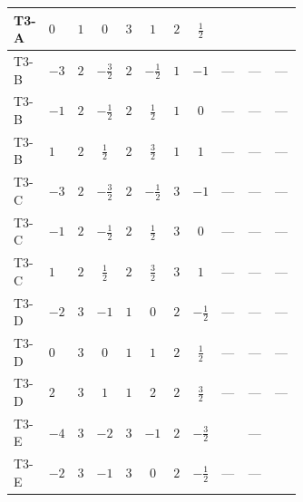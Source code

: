\documentclass[8pt]{article}
\begin{document}
\begin{landscape}
\begin{longtable}{@{}llcccccc >{\raggedright\arraybackslash}p{0.21\linewidth} >{\raggedright\arraybackslash}p{0.21\linewidth} >{\raggedright\arraybackslash}p{0.21\linewidth}@{}}
\midrule
T3-A & $0$ & $1$ & $0$ & $3$ & $1$ & $2$ & $\frac{1}{2}$ & \scriptsize\adjustbox{max width=\linewidth}{$\begin{gathered} +\frac{3 {g_1}^4}{2}\end{gathered}$} & \scriptsize\adjustbox{max width=\linewidth}{$\begin{gathered} +\frac{{\lambda_{12}^{(1)}}^2}{4}\end{gathered}$} & \scriptsize\adjustbox{max width=\linewidth}{$\begin{gathered} +\frac{{\lambda_{HS_2}^{(1)}}^2}{2}\end{gathered}$} \\
\midrule
T3-B & $-3$ & $2$ & $-\frac{3}{2}$ & $2$ & $-\frac{1}{2}$ & $1$ & $-1$ & --- & --- & --- \\
\midrule
T3-B & $-1$ & $2$ & $-\frac{1}{2}$ & $2$ & $\frac{1}{2}$ & $1$ & $0$ & --- & --- & --- \\
\midrule
T3-B & $1$ & $2$ & $\frac{1}{2}$ & $2$ & $\frac{3}{2}$ & $1$ & $1$ & --- & --- & --- \\
\midrule
T3-C & $-3$ & $2$ & $-\frac{3}{2}$ & $2$ & $-\frac{1}{2}$ & $3$ & $-1$ & --- & --- & --- \\
\midrule
T3-C & $-1$ & $2$ & $-\frac{1}{2}$ & $2$ & $\frac{1}{2}$ & $3$ & $0$ & --- & --- & --- \\
\midrule
T3-C & $1$ & $2$ & $\frac{1}{2}$ & $2$ & $\frac{3}{2}$ & $3$ & $1$ & --- & --- & --- \\
\midrule
T3-D & $-2$ & $3$ & $-1$ & $1$ & $0$ & $2$ & $-\frac{1}{2}$ & --- & --- & --- \\
\midrule
T3-D & $0$ & $3$ & $0$ & $1$ & $1$ & $2$ & $\frac{1}{2}$ & --- & --- & --- \\
\midrule
T3-D & $2$ & $3$ & $1$ & $1$ & $2$ & $2$ & $\frac{3}{2}$ & --- & --- & --- \\
\midrule
T3-E & $-4$ & $3$ & $-2$ & $3$ & $-1$ & $2$ & $-\frac{3}{2}$ & \scriptsize\adjustbox{max width=\linewidth}{$\begin{gathered} +\frac{3 {g_1}^4}{2}\end{gathered}$} & --- & \scriptsize\adjustbox{max width=\linewidth}{$\begin{gathered} +\frac{{\lambda_{HS_2}^{(1)}}^2}{2}\end{gathered}$} \\
\midrule
T3-E & $-2$ & $3$ & $-1$ & $3$ & $0$ & $2$ & $-\frac{1}{2}$ & --- & --- & \scriptsize\adjustbox{max width=\linewidth}{$\begin{gathered} +\frac{{\lambda_{HS_2}^{(1)}}^2}{2}\end{gathered}$} \\

\end{longtable}
\end{landscape}
\end{document}
